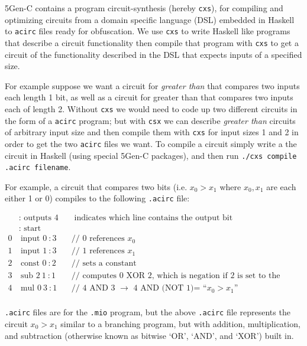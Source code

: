 \documentclass[12pt,twoside]{reedthesis}
\begin{document}
   5Gen-C contains a program circuit-synthesis (hereby \texttt{cxs}), for compiling and optimizing circuits from a domain specific language (DSL) embedded in Haskell to \texttt{acirc} files ready for obfuscation. We use \texttt{cxs} to write Haskell like programs that describe a circuit functionality then compile that program with \texttt{cxs} to get a circuit of the functionality described in the DSL that expects inputs of a specified size.
   \par For example suppose we want a circuit for \textit{greater than} that compares two inputs each length 1 bit, as well as a circuit for greater than that compares two inputs each of length 2. Without \texttt{cxs} we would need to code up two different circuits in the form of a \texttt{acirc} program; but with \texttt{csx} we can describe \textit{greater than} circuits of arbitrary input size and then compile them with \texttt{cxs} for input sizes 1 and 2 in order to get the two \texttt{acirc} files we want. To compile a circuit simply write a the circuit in Haskell (using special 5Gen-C packages), and then run \texttt{./cxs compile .acirc filename}.
   \par For example, a circuit that compares two bits (i.e. $x_0 > x_1$ where $x_0,x_1$ are each either 1 or 0) compiles to the following \texttt{.acirc} file:
   
   \newcommand{\sub}[0]{\text{ sub }}
   \newcommand{\mul}[0]{\text{ mul }}
   
   \begin{align*}
  &\text{: outputs } 4 &&\text{ indicates which line contains the output bit} \\
  &\text{: start }  & \\
0&\ \text{input } 0\ : 3  &&\text{// 0 references $x_0$} \\
1&\ \text{input } 1\ : 3  &&\text{// 1 references $x_1$} \\
2&\ \text{const } 0\ : 2 &&\text{// sets a constant} \\
3&\ \text{sub } 2\ 1\ : 1 &&\text{// computes 0 XOR 2, which is negation if 2 is set to the value ``1''} \\
4&\ \text{mul } 0\ 3\ : 1 &&\text{// 4 AND 3 $\to$ 4 AND (NOT 1)= ``$x_0 >x_1$''} \\
   \end{align*} 
  
   \texttt{.acirc} files are for the \texttt{.mio} program, but the above \texttt{.acirc} file represents the circuit $x_0 > x_1$ similar to a branching program, but with addition, multiplication, and subtraction (otherwise known as bitwise `OR', `AND', and `XOR') built in.          
         
\end{document}
